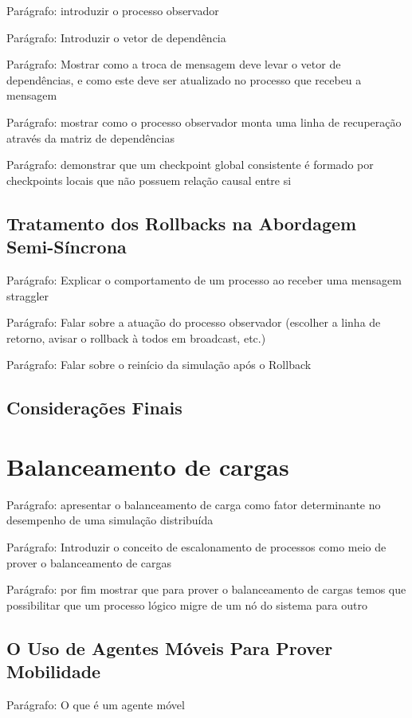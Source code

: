 Parágrafo: introduzir o processo observador

Parágrafo: Introduzir o vetor de dependência

Parágrafo: Mostrar como a troca de mensagem deve levar o vetor de dependências, e como este deve ser atualizado no processo que recebeu a mensagem

Parágrafo: mostrar como o processo observador monta uma linha de recuperação através da matriz de dependências

Parágrafo: demonstrar que um checkpoint global consistente é formado por checkpoints locais que não possuem relação causal entre si


\subsection{Tratamento dos Rollbacks na Abordagem Semi-Síncrona}

Parágrafo: Explicar o comportamento de um processo ao receber uma mensagem straggler 

Parágrafo: Falar sobre a atuação do processo observador (escolher a linha de retorno, avisar o rollback à todos em broadcast, etc.)

Parágrafo: Falar sobre o reinício da simulação após o Rollback

\subsection{Considerações Finais}


\section{Balanceamento de cargas}

Parágrafo: apresentar o balanceamento de carga como fator determinante no desempenho de uma simulação distribuída

Parágrafo: Introduzir o conceito de escalonamento de processos como meio de prover o balanceamento de cargas

Parágrafo: por fim mostrar que para prover o balanceamento de cargas temos que possibilitar que um processo lógico migre de um nó do sistema para outro

\subsection{O Uso de Agentes Móveis Para Prover Mobilidade}

Parágrafo: O que é um agente móvel


